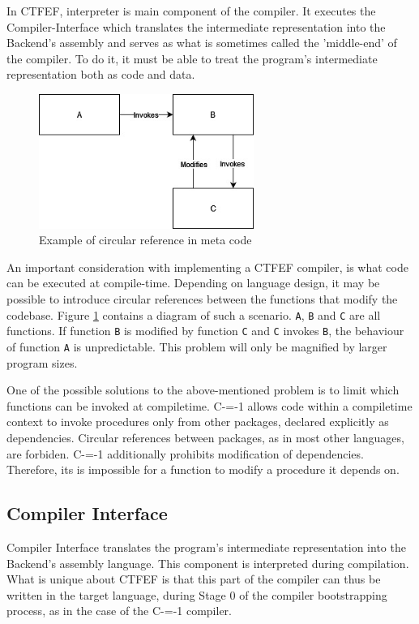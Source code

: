 In CTFEF, interpreter is main component of the compiler.
It executes the Compiler-Interface which translates the intermediate representation into the Backend's assembly and serves as what is sometimes called the 'middle-end' of the compiler\cite{hsu2021llvm}.
To do it, it must be able to treat the program's intermediate representation both as code and data.

\begin{figure}
	\includegraphics[width=7cm]{pictures/circular-function-reference.jpg}
	\caption{Example of circular reference in meta code}
	\label{circular-function-reference}
\end{figure}

An important consideration with implementing a CTFEF compiler, is what code can be executed at compile-time.
Depending on language design, it may be possible to introduce circular references between the functions that modify the codebase.
Figure \ref{circular-function-reference} contains a diagram of such a scenario.
\lstinline{A}, \lstinline{B} and \lstinline{C} are all functions.
If function \lstinline{B} is modified by function \lstinline{C} and \lstinline{C} invokes \lstinline{B}, the behaviour of function \lstinline{A} is unpredictable.
This problem will only be magnified by larger program sizes.


One of the possible solutions to the above-mentioned problem is to limit which functions can be invoked at compiletime.
C-=-1 allows code within a compiletime context to invoke procedures only from other packages, declared explicitly as dependencies.
Circular references between packages, as in most other languages, are forbiden.
C-=-1 additionally prohibits modification of dependencies.
Therefore, its is impossible for a function to modify a procedure it depends on.

\subsection{Compiler Interface}
\label{compiler-interface}

Compiler Interface translates the program's intermediate representation into the Backend's assembly language.
This component is interpreted during compilation.
What is unique about CTFEF is that this part of the compiler can thus be written in the target language, during Stage 0 of the compiler bootstrapping process, as in the case of the C-=-1 compiler\cite{puntambekar:compiler_design, novillo2007gcc, grabski2022compilation}.

